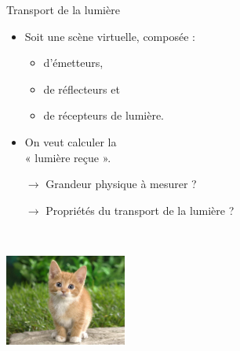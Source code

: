 \documentclass[10pt]{beamer}
\begin{document}
\begin{frame}{\large \insertsection}
    \begin{block}{Transport de la lumière }
        \begin{minipage}{0.45\textwidth}
            \begin{itemize}
                \item Soit une scène virtuelle, composée :
                    \begin{itemize}
                        \item d'émetteurs,
                        \item de réflecteurs et
                        \item de récepteurs de lumière.
                    \end{itemize}
                \item On veut calculer la \\ « lumière reçue ».
                \item [$\rightarrow$] Grandeur physique à mesurer ?
                \item [$\rightarrow$] Propriétés du transport de la lumière ?
            \end{itemize}
        \end{minipage}
        ~~
        \begin{minipage}{0.5\textwidth}
            \includegraphics[height=3cm]{images/chaton.jpg}
        \end{minipage}
    \end{block} 
\end{frame}
\end{document}
